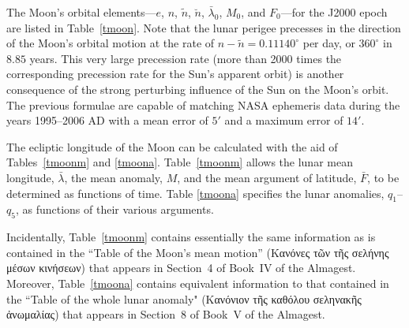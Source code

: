 The Moon's orbital elements---$e$, $n$, $\tilde{n}$, $\breve{n}$, 
$\bar{\lambda}_0$, $M_0$, and $F_0$---for the J2000 epoch are listed in Table~\ref{tmoon}. Note that the lunar perigee precesses in the
direction of the Moon's orbital motion at the rate of
$n-\tilde{n} = 0.11140^\circ $ per day, or $360^\circ$ in $8.85$ years. This
very large precession rate (more than 2000 times the corresponding
precession rate for the Sun's apparent orbit) is another consequence of the strong
perturbing influence of the Sun on the Moon's orbit.
The previous formulae are capable of matching NASA ephemeris
data during the years 1995--2006 AD with a mean error of $5'$  and
a maximum error of $14'$. 

The ecliptic longitude of the Moon can be calculated with the aid of Tables~\ref{tmoonm} and \ref{tmoona}.
Table~\ref{tmoonm} allows the lunar mean longitude, $\bar{\lambda}$,  the mean anomaly, $M$, and  the mean argument of latitude, $\bar{F}$, to be determined as functions of time.
Table \ref{tmoona} specifies the lunar anomalies, $q_1$--$q_5$, as functions of their various arguments.

Incidentally, Table~\ref{tmoonm} contains essentially the same information as is contained in the ``Table of the Moon's mean motion'' (Κανόνες τῶν τῆς σελήνης μέσων κινήσεων) that
appears in Section~4 of Book~IV of the Almagest. Moreover, Table~\ref{tmoona} contains equivalent information to that contained in the ``Table of the whole lunar anomaly" (Κανόνιον τῆς καθόλου σεληνακῆς ἀνωμαλίας)
that appears in Section~8 of Book~V of the Almagest. 


